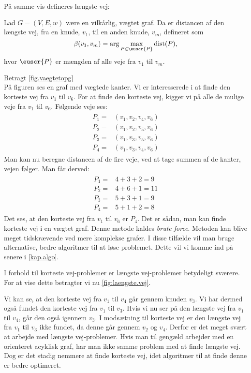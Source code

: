 På samme vis defineres længste vej:

\begin{defn} 
	Lad $G=(V,E,w)$ være en vilkårlig, vægtet graf. Da er distancen af den længste vej, fra en knude, $v_1$, til en anden knude, $v_m$, defineret som
	\begin{equation}
		\beta(v_1,v_m)=\arg \max_{P \in \euscr{P}}
		\textrm{dist}(P),
	\end{equation}
	hvor $\euscr{P}$ er mængden af alle veje fra $v_1$ til $v_m$.
\end{defn}

\begin{exmp}
Betragt \autoref{fig.vaegtetopg} \\

På figuren ses en graf med vægtede kanter. Vi er interesserede i at finde den korteste vej fra $v_1$ til $v_6$. For at finde den korteste vej, kigger vi på alle de mulige veje fra $v_1$ til $v_6$.
Følgende veje ses:
\begin{align}
\begin{split}
	P_1=&(v_1,v_2,v_4,v_6)\\
	P_2=&(v_1,v_2,v_5,v_6)\\
	P_3=&(v_1,v_3,v_5,v_6)\\
	P_4=&(v_1,v_3,v_4,v_6)
\end{split}
\end{align}
Man kan nu beregne distancen af de fire veje, ved at tage summen af de kanter, vejen følger. Man får derved:
\begin{align}
\begin{split}
	P_1=&4+3+2=9\\
	P_2=&4+6+1=11\\
	P_3=&5+3+1=9\\
	P_4=&5+1+2=8
\end{split}
\end{align}
Det ses, at den korteste vej fra $v_1$ til $v_6$ er $P_4$. 
Det er sådan, man kan finde korteste vej i en vægtet graf. Denne metode kaldes \emph{brute force}. Metoden kan blive meget tidskrævende ved mere komplekse grafer. I disse tilfælde vil man bruge alternative, bedre algoritmer til at løse problemet. Dette vil vi komme ind på senere i \autoref{kap.algo}.
\end{exmp}

I forhold til korteste vej-problemer er længste vej-problemer betydeligt sværere. For at vise dette betragter vi nu \autoref{fig:laengste.vej}.

Vi kan se, at den korteste vej fra $v_1$ til $v_4$ går gennem knuden $v_3$. Vi har dermed også fundet den korteste vej fra $v_1$ til $v_3$.
Hvis vi nu ser på den længste vej fra $v_1$ til $v_4$, går den også igennem $v_3$. I modsætning til korteste vej er den længste vej fra $v_1$ til $v_3$ ikke fundet, da denne går gennem $v_2$ og $v_4$. Derfor er det meget svært at arbejde med længste vej-problemer.
Hvis man til gengæld arbejder med en orienteret acyklisk graf, har man ikke samme problem med at finde længste vej. Dog er det stadig nemmere at finde korteste vej, idet algoritmer til at finde denne er bedre optimeret.
